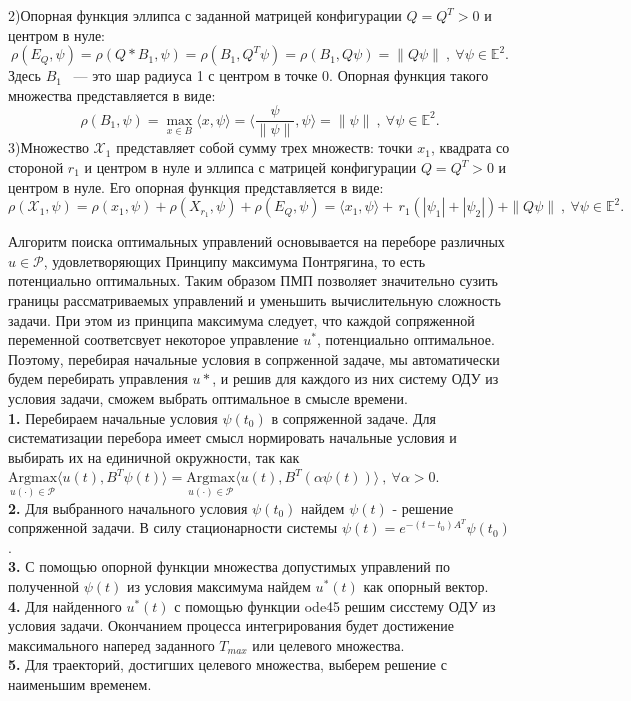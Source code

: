 \documentclass[10pt]{article}
\begin{document}
2)Опорная функция эллипса с заданной матрицей конфигурации \(Q = Q^T > 0\) и центром в нуле:
\[ \rho(E_Q, \psi) = \rho(Q * B_1, \psi) = \rho(B_1, Q^T \psi) = \rho(B_1, Q\psi) = \|Q\psi\| \ , \ \forall \psi \in \mathbb{E}^2.\]
Здесь \( B_1 \) ~--- это шар радиуса 1 с центром в точке 0. Опорная функция такого множества представляется в виде:
\[ \rho(B_1, \psi) = \max\limits_{x \in B} \langle x, \psi \rangle  =  \langle \frac{\psi}{ \| \psi \| }, \psi \rangle  = \| \psi \| \ , \ \forall \psi \in \mathbb{E}^2.\]
3)Множество \( \mathcal{X}_1\) представляет собой сумму трех множеств: точки \( x_1\), квадрата со стороной \(r_1\) и центром в нуле и эллипса с матрицей конфигурации \( Q = Q^T > 0\) и центром в нуле. Его опорная функция представляется в виде:
\[ \rho(\mathcal{X}_1, \psi) = \rho(x_1, \psi) + \rho(X_{r_1}, \psi) + \rho(E_Q, \psi) =  \langle x_1, \psi \rangle + \, r_1 (|\psi_1| + |\psi_2|) + \|Q\psi\| \ , \ \forall \psi \in \mathbb{E}^2.\]

Алгоритм поиска оптимальных управлений основывается на переборе различных \( u \in \mathcal{P} \), удовлетворяющих Принципу максимума Понтрягина, то есть потенциально оптимальных. Таким образом ПМП позволяет значительно сузить границы рассматриваемых управлений и уменьшить вычислительную сложность задачи. При этом из принципа максимума следует, что каждой сопряженной переменной соответсвует некоторое управление \( u^* \), потенциально оптимальное. Поэтому, перебирая начальные условия в сопрженной задаче, мы автоматически будем перебирать управления \( u* \), и решив для каждого из них систему ОДУ из условия задачи, сможем выбрать оптимальное в смысле времени.\bigskip\\
\textbf{1.} Перебираем начальные условия \( \psi(t_0) \) в сопряженной задаче. Для систематизации перебора имеет смысл нормировать начальные условия и выбирать их на единичной окружности, так как \( \underset{u(\cdot) \in \mathcal{P}}{\text{Argmax}} \langle u(t), B^T \psi(t) \rangle = \underset{u(\cdot) \in \mathcal{P}}{\text{Argmax}} \langle u(t), B^T (\alpha \psi(t)) \rangle \ , \ \forall \alpha > 0. \)\medskip\\
\textbf{2.} Для выбранного начального условия \( \psi(t_0) \) найдем \( \psi(t) \) - решение сопряженной задачи. В силу стационарности системы \( \psi(t) = e^{-(t - t_0)A^{T}}\psi(t_0) \).\medskip\\
\textbf{3.} С помощью опорной функции множества допустимых управлений по полученной \( \psi(t) \) из условия максимума найдем \( u^*(t) \) как опорный вектор.\medskip\\
\textbf{4.} Для найденного \( u^*(t) \) с помощью функции ode45 решим сисстему ОДУ из условия задачи. Окончанием процесса интегрирования будет достижение максимального наперед заданного \( T_{max} \) или целевого множества.\medskip\\
\textbf{5.} Для траекторий, достигших целевого множества, выберем решение с наименьшим временем.
\end{document}
